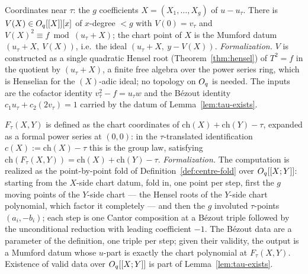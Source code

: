 \begin{definition}
\label{def:chart}
\leanok
{}
Coordinates near $\tau$: the $g$ coefficients $X = (X_1,\dots,X_g)$ of $u - u_\tau$.
There is $V(X) \in O_q[[X]][x]$ of $x$-degree $< g$ with $V(0) = v_\tau$ and
$V(X)^2 \equiv f \bmod (u_\tau + X)$; the chart point of $X$ is the Mumford datum
$(u_\tau + X,\ V(X))$, i.e.\ the ideal $(u_\tau + X,\ y - V(X))$. \emph{Formalization.}
$V$ is constructed as a single quadratic Hensel root (Theorem~\ref{thm:hensel}) of
$T^2 = f$ in the quotient by $(u_\tau + X)$, a finite free algebra over the power
series ring, which is Henselian for the $(X)$-adic ideal; no topology on $O_q$ is
needed. The inputs are the cofactor identity $v_\tau^2 - f = u_\tau w$ and the B\'ezout
identity $c_1 u_\tau + c_2 (2 v_\tau) = 1$ carried by the datum of
Lemma~\ref{lem:tau-exists}.
\end{definition}

\begin{definition}
\label{def:Ftau}
\leanok
{}
$F_\tau(X,Y)$ is defined as the chart coordinates of
$\mathrm{ch}(X) + \mathrm{ch}(Y) - \tau$, expanded as a formal power series at $(0,0)$:
in the $\tau$-translated identification $c(X) := \mathrm{ch}(X) - \tau$ this is the
group law, satisfying $\mathrm{ch}(F_\tau(X,Y)) = \mathrm{ch}(X) + \mathrm{ch}(Y) -
\tau$. \emph{Formalization.} The computation is realized as the point-by-point fold of
Definition~\ref{def:centre-fold} over $O_q[[X;Y]]$: starting from the $X$-side chart
datum, fold in, one point per step, first the $g$ moving points of the $Y$-side chart
--- the Hensel roots of the $Y$-side chart polynomial, which factor it completely ---
and then the $g$ involuted $\tau$-points $(a_i, -b_i)$; each step is one Cantor
composition at a B\'ezout triple followed by the unconditional reduction with leading
coefficient $-1$. The B\'ezout data are a parameter of the definition, one triple per
step; given their validity, the output is a Mumford datum whose $u$-part is exactly the
chart polynomial at $F_\tau(X,Y)$. Existence of valid data over $O_q[[X;Y]]$ is part of
Lemma~\ref{lem:tau-exists}.
\end{definition}

